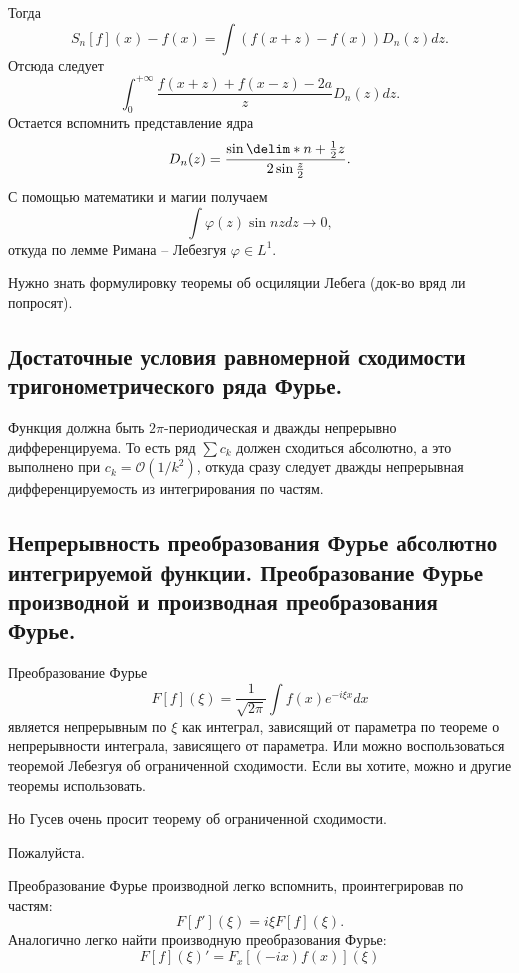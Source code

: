 Тогда
\begin{equation*}
    S_n[f](x) - f(x) = \int(f(x + z) - f(x)) D_n(z) dz.
\end{equation*}
Отсюда следует
\begin{equation*}
    \int_0^{+\infty} \frac{f(x + z) + f(x - z) - 2a}{z}D_n(z) dz.
\end{equation*}
Остается вспомнить представление ядра
\begin{equation*}
    D_n(z) = \frac{\sin\delim*{n + \frac12}z}{2\sin \frac z2}.
\end{equation*}
С помощью математики и магии получаем
\begin{equation*}
    \int \varphi(z) \sin nz dz \to 0,
\end{equation*}
откуда по лемме Римана -- Лебезгуя $\varphi \in L^1$.

Нужно знать формулировку теоремы об осциляции Лебега (док-во вряд ли попросят).

\subsection{Достаточные условия равномерной сходимости тригонометрического ряда Фурье.}

Функция должна быть $2\pi$-периодическая и дважды непрерывно дифференцируема. То есть ряд $\sum c_k$ должен сходиться абсолютно, а это выполнено при $c_k = \mathcal{O}(1/k^2)$, откуда сразу следует дважды непрерывная дифференцируемость из интегрирования по частям. 

\subsection{Непрерывность преобразования Фурье абсолютно интегрируемой функции.
Преобразование Фурье производной и производная преобразования Фурье.}

Преобразование Фурье 
\begin{equation*}
    F[f](\xi) = \frac{1}{\sqrt{2\pi}} \int f(x) e^{-i\xi x} dx
\end{equation*}
является непрерывным по $\xi$ как интеграл, зависящий от параметра по теореме о непрерывности интеграла, зависящего от параметра. Или можно воспользоваться теоремой Лебезгуя об ограниченной сходимости. Если вы хотите, можно и другие теоремы использовать. 

Но Гусев очень просит теорему об ограниченной сходимости.

Пожалуйста.

Преобразование Фурье производной легко вспомнить, проинтегрировав по частям:
\begin{equation*}
    F[f'](\xi) = i\xi F[f](\xi).
\end{equation*}
Аналогично легко найти производную преобразования Фурье:
\begin{equation*}
    F[f](\xi)' = F_x[(-ix)f(x)](\xi)
\end{equation*}

